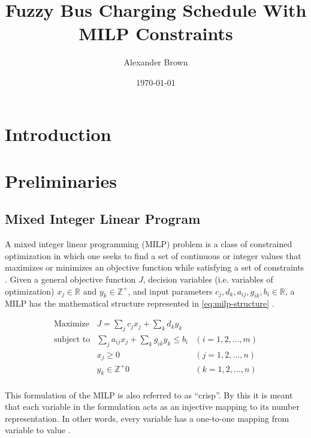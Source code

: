 \documentclass[11pt,a4paper,final]{article}
\author{Alexander Brown}
\date{\today}
\title{Fuzzy Bus Charging Schedule With MILP Constraints}
\let\ref\autoref                                      %
\begin{document}
\maketitle
\tableofcontents

\let\ref\autoref                            %

\section{Introduction}
\label{sec:orgc45300f}
\section{Preliminaries}
\label{sec:org9061bc1}
\subsection{Mixed Integer Linear Program}
\label{sec:org104a721}
A mixed integer linear programming (MILP) problem is a class of constrained optimization in which one seeks to find a
set of continuous or integer values that maximizes or minimizes an objective function while satisfying a set of
constraints \cite{chen-2010-applied}. Given a general objective function \(J\), decision variables (i.e. variables of
optimization) \(x_j \in \mathbb{R}\) and \(y_k \in \mathbb{Z}^+\), and input parameters \(c_j, d_k, a_{ij}, g_{ik}, b_i \in \mathbb{R}\), a MILP has the
mathematical structure represented in \ref{eq:milp-structure} \cite{chen-2010-applied}.

\begin{equation}
\label{eq:milp-structure}
\begin{array}{lll}
\text{Maximize}   & J = \sum_j c_j x_j + \sum_k d_k y_k            &                 \\
\text{subject to} & \sum_j a_{ij} x_j + \sum_k g_{ik} y_k  \le b_i & (i = 1,2,...,m) \\
                  & x_j \ge 0                                      & (j = 1,2,...,n) \\
                  & y_k \in \mathbb{Z^+}0                          & (k = 1,2,...,n) \\
\end{array}
\end{equation}

This formulation of the MILP is also referred to as ``crisp''. By this it is meant that each variable in the formulation
acts as an injective mapping to its number representation. In other words, every variable has a one-to-one mapping from
variable to value \cite{kaur-2016-introd-fuzzy}.
\end{document}
